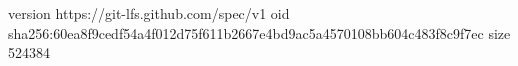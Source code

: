 version https://git-lfs.github.com/spec/v1
oid sha256:60ea8f9cedf54a4f012d75f611b2667e4bd9ac5a4570108bb604c483f8c9f7ec
size 524384
